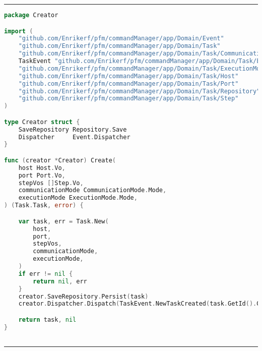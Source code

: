 
\phantom{blank}
\vspace{5mm}
\hrule
\begin{lstlisting}[language=Go,caption={Creator.go},breaklines=true,label={lst:Creator}]
package Creator

import (
	"github.com/Enrikerf/pfm/commandManager/app/Domain/Event"
	"github.com/Enrikerf/pfm/commandManager/app/Domain/Task"
	"github.com/Enrikerf/pfm/commandManager/app/Domain/Task/CommunicationMode"
	TaskEvent "github.com/Enrikerf/pfm/commandManager/app/Domain/Task/Event"
	"github.com/Enrikerf/pfm/commandManager/app/Domain/Task/ExecutionMode"
	"github.com/Enrikerf/pfm/commandManager/app/Domain/Task/Host"
	"github.com/Enrikerf/pfm/commandManager/app/Domain/Task/Port"
	"github.com/Enrikerf/pfm/commandManager/app/Domain/Task/Repository"
	"github.com/Enrikerf/pfm/commandManager/app/Domain/Task/Step"
)

type Creator struct {
	SaveRepository Repository.Save
	Dispatcher     Event.Dispatcher
}

func (creator *Creator) Create(
	host Host.Vo,
	port Port.Vo,
	stepVos []Step.Vo,
	communicationMode CommunicationMode.Mode,
	executionMode ExecutionMode.Mode,
) (Task.Task, error) {

	var task, err = Task.New(
		host,
		port,
		stepVos,
		communicationMode,
		executionMode,
	)
	if err != nil {
		return nil, err
	}
	creator.SaveRepository.Persist(task)
	creator.Dispatcher.Dispatch(TaskEvent.NewTaskCreated(task.GetId().GetUuidString()))

	return task, nil
}



\end{lstlisting}
\hrule